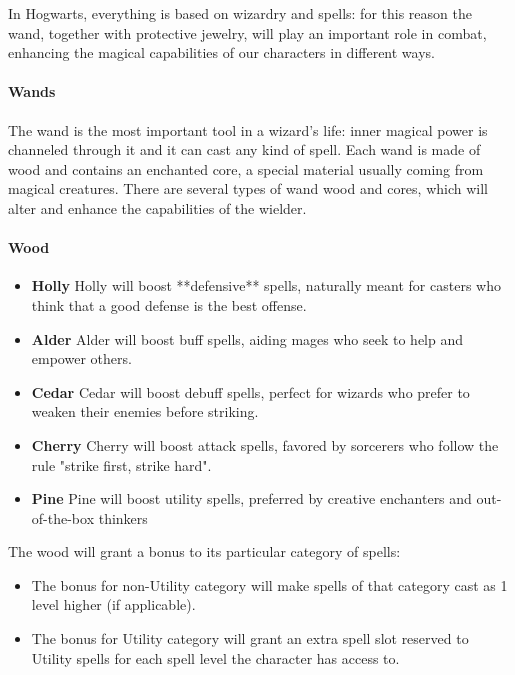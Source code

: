 In Hogwarts, everything is based on wizardry and spells: for this reason the wand, together with protective jewelry, will play an important role in combat, enhancing the magical capabilities of our characters in different ways.

\paragraph{Wands} 

The wand is the most important tool in a wizard's life: inner magical power is channeled through it and it can cast any kind of spell. Each wand is made of wood and contains an enchanted core, a special material usually coming from magical creatures.
There are several types of wand wood and cores, which will alter and enhance the capabilities of the wielder.

\paragraph{Wood}

\begin{itemize}
    \item \textbf{Holly} 
Holly will boost **defensive** spells, naturally meant for casters who think that a good defense is the best offense. 

 \item \textbf{Alder}
Alder will boost buff spells, aiding mages who seek to help and empower others.

 \item \textbf{Cedar}
Cedar will boost debuff spells, perfect for wizards who prefer to weaken their enemies before striking.

 \item \textbf {Cherry}
Cherry will boost attack spells, favored by sorcerers who follow the rule "strike first, strike hard".

 \item \textbf{Pine}
Pine will boost utility spells, preferred by creative enchanters and out-of-the-box thinkers
\end{itemize}

The wood will grant a bonus to its particular category of spells: 

\begin{itemize}
    \item The bonus for non-Utility category will make spells of that category cast as 1 level higher (if applicable).
    \item The bonus for Utility category will grant an extra spell slot reserved to Utility spells for each spell level the character has access to.
\end{itemize}
\pagebreak